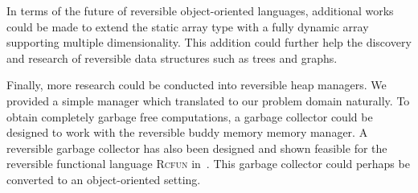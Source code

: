 In terms of the future of reversible object-oriented languages, additional works could be made to extend the static array type with a fully dynamic array supporting multiple dimensionality. This addition could further help the discovery and research of reversible data structures such as trees and graphs.

Finally, more research could be conducted into reversible heap managers. We provided a simple manager which translated to our problem domain naturally. To obtain completely garbage free computations, a garbage collector could be designed to work with the reversible buddy memory memory manager. A reversible garbage collector has also been designed and shown feasible for the reversible functional language \textsc{Rcfun} in~\cite{tm:garbage}. This garbage collector could perhaps be converted to an object-oriented setting.  
